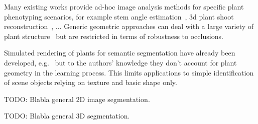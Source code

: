 Many existing works provide ad-hoc image analysis methods for specific plant
phenotyping scenarios, for example stem angle
estimation~\cite{das2017automated}, 3d plant shoot
reconstruction~\cite{scharr2017fast}, ... Generic geometric approaches can deal
with a large variety of plant structure~\cite{reeb2018quantification} but are restricted in terms of robustness to
occlusions.

Simulated rendering of plants for semantic segmentation have already
been developed, e.g.~\cite{duboudin_toward_2019} but to the authors' knowledge
they don't account for plant geometry in the learning process. This limits applications
to simple identification of scene objects relying on texture and basic shape only.

TODO: Blabla general 2D image segmentation.

TODO: Blabla general 3D segmentation.

% 
